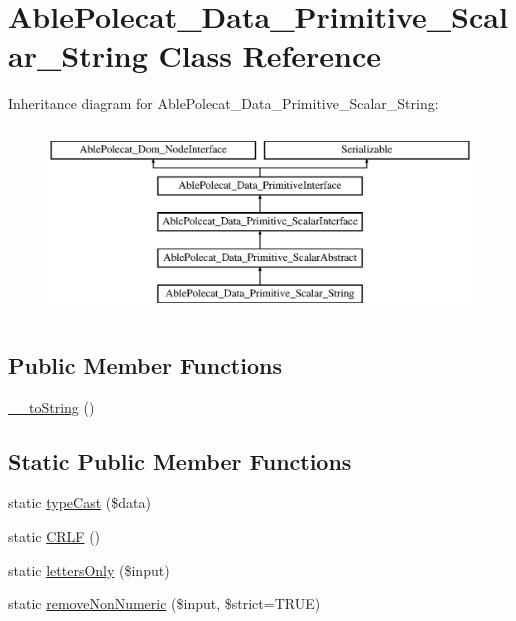 \hypertarget{class_able_polecat___data___primitive___scalar___string}{}\section{Able\+Polecat\+\_\+\+Data\+\_\+\+Primitive\+\_\+\+Scalar\+\_\+\+String Class Reference}
\label{class_able_polecat___data___primitive___scalar___string}
Inheritance diagram for Able\+Polecat\+\_\+\+Data\+\_\+\+Primitive\+\_\+\+Scalar\+\_\+\+String\+:\begin{figure}[H]
\begin{center}
\leavevmode
\includegraphics[height=5.000000cm]{class_able_polecat___data___primitive___scalar___string}
\end{center}
\end{figure}
\subsection*{Public Member Functions}
\begin{DoxyCompactItemize}
\item 
\hyperlink{class_able_polecat___data___primitive___scalar___string_a7516ca30af0db3cdbf9a7739b48ce91d}{\+\_\+\+\_\+to\+String} ()
\end{DoxyCompactItemize}
\subsection*{Static Public Member Functions}
\begin{DoxyCompactItemize}
\item 
static \hyperlink{class_able_polecat___data___primitive___scalar___string_a68640750b79d1cdda3cddcece68a207e}{type\+Cast} (\$data)
\item 
static \hyperlink{class_able_polecat___data___primitive___scalar___string_a8f50c9c76b506aa4997c11fdc2c753c2}{C\+R\+L\+F} ()
\item 
static \hyperlink{class_able_polecat___data___primitive___scalar___string_ab2a7acaf93e00fbbd75ea51e56bbf47e}{letters\+Only} (\$input)
\item 
static \hyperlink{class_able_polecat___data___primitive___scalar___string_a4479eb889ba989e9b62e70ccd91ae163}{remove\+Non\+Numeric} (\$input, \$strict=T\+R\+U\+E)
\end{DoxyCompactItemize}
